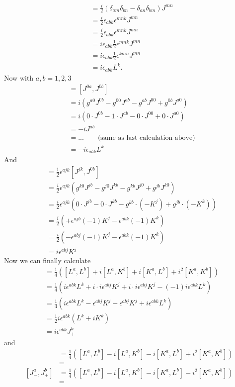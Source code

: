 \documentclass[../main.tex]{subfiles}
\begin{document}
\begin{enumerate}[(a)]
\begin{align}
&=\frac{i}{2}(\delta_{am}\delta_{bn}-\delta_{an}\delta_{bm})J^{mn}\\
&=\frac{i}{2}\epsilon_{abk}\epsilon^{mnk}J^{mn}\\
&=\frac{i}{2}\epsilon_{abk}\epsilon^{mnk}J^{mn}\\
&=i\epsilon_{abk}\frac{1}{2}\epsilon^{mnk}J^{mn}\\
&=i\epsilon_{abk}\frac{1}{2}\epsilon^{kmn}J^{mn}\\
&=i\epsilon_{abk}L^k.
\end{align}
Now with $a,b=1,2,3$
\begin{align}
[K^a,K^b]
&=[J^{0a},J^{0b}]\\
&=i(g^{a0}J^{0b}-g^{00}J^{ab}-g^{ab}J^{00}+g^{0b}J^{a0})\\
&=i(0\cdot J^{0b}-1\cdot J^{ab}-0\cdot J^{00}+0\cdot J^{a0})\\
&=-iJ^{ab}\\
&=...\qquad\text{(same as last calculation above)}\\
&=-i\epsilon_{abk}L^k
\end{align}
And
\begin{align}
[L^a,K^b]
&=\frac{1}{2}\epsilon^{ajk}[J^{jk},J^{0b}]\\
&=\frac{i}{2}\epsilon^{ajk}(g^{k0}J^{jb}-g^{j0}J^{kb}-g^{kb}J^{j0}+g^{jb}J^{k0})\\
&=\frac{i}{2}\epsilon^{ajk}\left(0\cdot J^{jb}-0\cdot J^{kb}-g^{kb}\cdot(-K^j)+g^{jb}\cdot(-K^k)\right)\\
&=\frac{i}{2}\left(+\epsilon^{ajb}(-1)K^j-\epsilon^{abk}(-1)K^k\right)\\
&=\frac{i}{2}\left(-\epsilon^{abj}(-1)K^j-\epsilon^{abk}(-1)K^k\right)\\
&=i\epsilon^{abj}K^j
\end{align}
Now we can finally calculate 
\begin{align}
[J_+^a,J_+^b]&=\frac{1}{4}\left([L^a,L^b]+i[L^a,K^b]+i[K^a,L^b]+i^2[K^a,K^b]\right)\\
&=\frac{1}{4}\left(i\epsilon^{abk}L^k+i\cdot i\epsilon^{abj}K^j+i\cdot i\epsilon^{abj}K^j-(-1)i\epsilon^{abk}L^k\right)\\
&=\frac{1}{4}\left(i\epsilon^{abk}L^k-\epsilon^{abj}K^j-\epsilon^{abj}K^j+i\epsilon^{abk}L^k\right)\\
&=\frac{1}{2}i\epsilon^{abk}(L^k+iK^k)\\
&=i\epsilon^{abk}J_+^k
\end{align}
and
\begin{align}
[J_-^a,J_-^b]&=\frac{1}{4}\left([L^a,L^b]-i[L^a,K^b]-i[K^a,L^b]+i^2[K^a,K^b]\right)\\
&=\\
[J_-^a,J_+^b]&=\frac{1}{4}\left([L^a,L^b]-i[L^a,K^b]-i[K^a,L^b]-i^2[K^a,K^b]\right)\\
&=
\end{align}

\end{enumerate}
\end{document}
